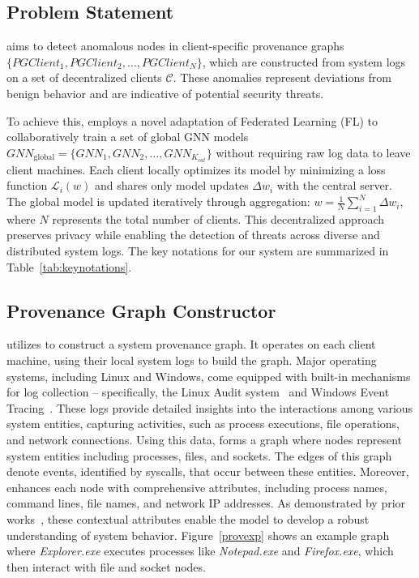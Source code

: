 \subsection{Problem Statement}

\Sys aims to detect anomalous nodes in client-specific provenance graphs \( \{PGClient_{1}, PGClient_{2}, \ldots, PGClient_{N}\} \), which are constructed from system logs on a set of decentralized clients \( \mathcal{C} \). These anomalies represent deviations from benign behavior and are indicative of potential security threats.

To achieve this, \Sys employs a novel adaptation of Federated Learning (FL) to collaboratively train a set of global GNN models \( {GNN}_{\text{global}} = \{GNN_1, GNN_2, \ldots, GNN_{K_{cat}}\} \) without requiring raw log data to leave client machines. Each client locally optimizes its model by minimizing a loss function \( \mathcal{L}_i(w) \) and shares only model updates \( \Delta w_i \) with the central server. The global model is updated iteratively through aggregation: \( w = \frac{1}{N} \sum_{i=1}^{N} \Delta w_i, \)
where \( N \) represents the total number of clients. This decentralized approach preserves privacy while enabling the detection of threats across diverse and distributed system logs. The key notations for our system are summarized in Table~\ref{tab:keynotations}.



\subsection{Provenance Graph Constructor}
\label{sub:provconstruct}

\Sys utilizes \logs to construct a system provenance graph. It operates on each client machine, using their local system logs to build the graph. Major operating systems, including Linux and Windows, come equipped with built-in mechanisms for log collection -- specifically, the Linux Audit system~\cite{linuxaudit} and Windows Event Tracing~\cite{windowsaudit}. These logs provide detailed insights into the interactions among various system entities, capturing activities, such as process executions, file operations, and network connections. Using this data, \Sys forms a graph where nodes represent system entities including processes, files, and sockets. The edges of this graph denote events, identified by syscalls, that occur between these entities. Moreover, \Sys enhances each node with comprehensive attributes, including process names, command lines, file names, and network IP addresses. As demonstrated by prior works~\cite{flash2024,cheng2023kairos}, these contextual attributes enable the model to develop a robust understanding of system behavior. Figure~\ref{provexp} shows an example graph where \textit{Explorer.exe} executes processes like \textit{Notepad.exe} and \textit{Firefox.exe}, which then interact with file and socket nodes.

